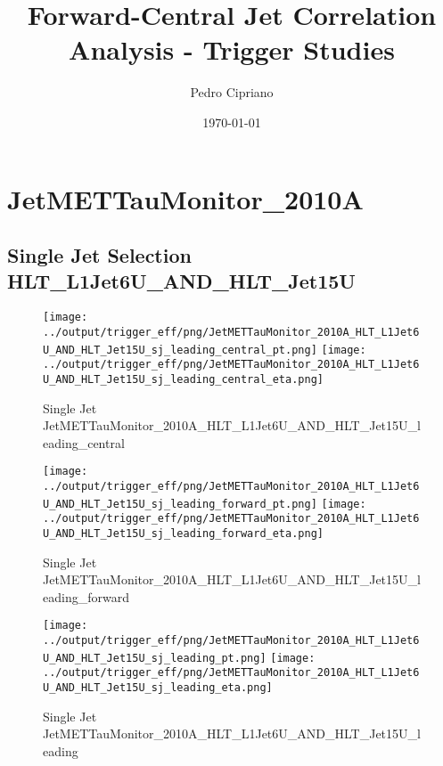 \documentclass[11pt]{article}
\begin{document}
         
 
 \author{Pedro Cipriano}
 \date{\today}
 \title{Forward-Central Jet Correlation Analysis - Trigger Studies}

\maketitle

\newpage
\section{JetMETTauMonitor\_2010A}

\subsection{Single Jet Selection HLT\_L1Jet6U\_AND\_HLT\_Jet15U}
\begin{figure}[ht]
\centering
\texttt{[image: ../output/trigger\_eff/png/JetMETTauMonitor\_2010A\_HLT\_L1Jet6U\_AND\_HLT\_Jet15U\_sj\_leading\_central\_pt.png]}
\texttt{[image: ../output/trigger\_eff/png/JetMETTauMonitor\_2010A\_HLT\_L1Jet6U\_AND\_HLT\_Jet15U\_sj\_leading\_central\_eta.png]}
\caption{Single Jet JetMETTauMonitor\_2010A\_HLT\_L1Jet6U\_AND\_HLT\_Jet15U\_leading\_central}
\label{fig:jetmettaumon_sj_HLT_L1Jet6U_AND_HLT_Jet15U_leading_central}
\end{figure}

\begin{figure}[ht]
\centering
\texttt{[image: ../output/trigger\_eff/png/JetMETTauMonitor\_2010A\_HLT\_L1Jet6U\_AND\_HLT\_Jet15U\_sj\_leading\_forward\_pt.png]}
\texttt{[image: ../output/trigger\_eff/png/JetMETTauMonitor\_2010A\_HLT\_L1Jet6U\_AND\_HLT\_Jet15U\_sj\_leading\_forward\_eta.png]}
\caption{Single Jet JetMETTauMonitor\_2010A\_HLT\_L1Jet6U\_AND\_HLT\_Jet15U\_leading\_forward}
\label{fig:jetmettaumon_sj_HLT_L1Jet6U_AND_HLT_Jet15U_leading_forward}
\end{figure}

\begin{figure}[ht]
\centering
\texttt{[image: ../output/trigger\_eff/png/JetMETTauMonitor\_2010A\_HLT\_L1Jet6U\_AND\_HLT\_Jet15U\_sj\_leading\_pt.png]}
\texttt{[image: ../output/trigger\_eff/png/JetMETTauMonitor\_2010A\_HLT\_L1Jet6U\_AND\_HLT\_Jet15U\_sj\_leading\_eta.png]}
\caption{Single Jet JetMETTauMonitor\_2010A\_HLT\_L1Jet6U\_AND\_HLT\_Jet15U\_leading}
\label{fig:jetmettaumon_sj_HLT_L1Jet6U_AND_HLT_Jet15U_leading}
\end{figure}
\end{document}
